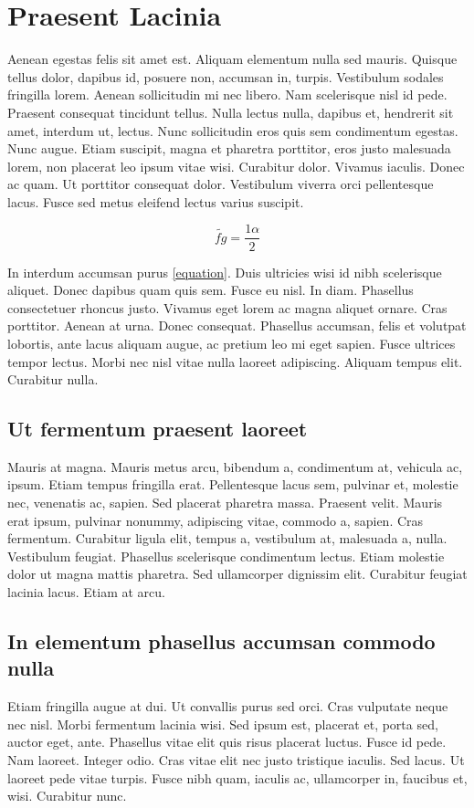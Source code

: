 

\chapter{Praesent Lacinia}
 Aenean egestas felis sit amet est. Aliquam
elementum nulla sed mauris. Quisque tellus dolor, dapibus id,
posuere non, accumsan in, turpis.  Vestibulum sodales fringilla
lorem. Aenean sollicitudin mi nec libero. Nam scelerisque nisl id
pede. Praesent consequat tincidunt tellus. Nulla lectus nulla,
dapibus et, hendrerit sit amet, interdum ut, lectus. Nunc
sollicitudin eros quis sem condimentum egestas. Nunc augue. Etiam
suscipit, magna et pharetra porttitor, eros justo malesuada lorem,
non placerat leo ipsum vitae wisi. Curabitur dolor. Vivamus
iaculis. Donec ac quam. Ut porttitor consequat dolor. Vestibulum
viverra orci pellentesque lacus. Fusce sed metus eleifend lectus
varius suscipit.

\begin{equation}\label{equation}
    \widetilde{fg}= \frac{1\alpha}{2}
\end{equation}

In interdum accumsan purus \ref{equation}. Duis ultricies wisi id
nibh scelerisque aliquet. Donec dapibus quam quis sem. Fusce eu
nisl. In diam. Phasellus consectetuer rhoncus justo. Vivamus eget
lorem ac magna aliquet ornare. Cras porttitor. Aenean at urna.
Donec consequat. Phasellus accumsan, felis et volutpat lobortis,
ante lacus aliquam augue, ac pretium leo mi eget sapien. Fusce
ultrices tempor lectus. Morbi nec nisl vitae nulla laoreet
adipiscing. Aliquam tempus elit. Curabitur nulla.

\section{Ut fermentum praesent laoreet} Mauris at magna. Mauris
metus arcu, bibendum a, condimentum at, vehicula ac, ipsum. Etiam
tempus fringilla erat. Pellentesque lacus sem, pulvinar et,
molestie nec, venenatis ac, sapien. Sed placerat pharetra massa.
Praesent velit. Mauris erat ipsum, pulvinar nonummy, adipiscing
vitae, commodo a, sapien. Cras fermentum. Curabitur ligula elit,
tempus a, vestibulum at, malesuada a, nulla. Vestibulum feugiat.
Phasellus scelerisque condimentum lectus. Etiam molestie dolor ut
magna mattis pharetra. Sed ullamcorper dignissim elit. Curabitur
feugiat lacinia lacus. Etiam at arcu.

\section{In elementum phasellus accumsan commodo nulla} Etiam
fringilla augue at dui. Ut convallis purus sed orci. Cras
vulputate neque nec nisl. Morbi fermentum lacinia wisi. Sed ipsum
est, placerat et, porta sed, auctor eget, ante. Phasellus vitae
elit quis risus placerat luctus. Fusce id pede. Nam laoreet.
Integer odio. Cras vitae elit nec justo tristique iaculis. Sed
lacus. Ut laoreet pede vitae turpis. Fusce nibh quam, iaculis ac,
ullamcorper in, faucibus et, wisi. Curabitur nunc.

